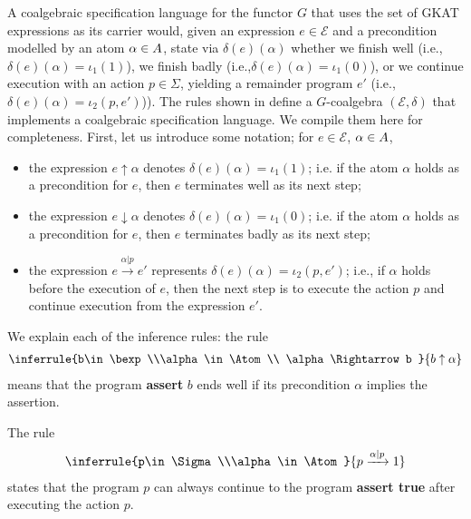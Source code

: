A coalgebraic specification language for the functor $G$ that uses the set of GKAT expressions as its carrier would, given an expression $e\in \mathscr{E}$ and a precondition modelled by an atom $\alpha\in A$, state via $\delta(e)(\alpha)$ whether we finish well (i.e.,$\delta(e)(\alpha)=\iota_1(1)$), we finish badly (i.e.,$\delta(e)(\alpha)=\iota_1(0)$), or we continue execution with an action $p\in \Sigma$, yielding a remainder program $e'$ (i.e.,$\delta(e)(\alpha)=\iota_2(p,e')$)). The rules shown in \cite[Figure 2]{GKATCoequations} define a $G$-coalgebra $(\mathscr{E},\delta)$ that implements a coalgebraic specification language. We compile them here for completeness. First, let us introduce some notation; for $e\in \mathscr{E}$, $\alpha\in A$, 
\begin{itemize}
    \item the expression $e\uparrow \alpha $ denotes $\delta(e)(\alpha)=\iota_1(1)$; i.e. if the atom $\alpha$ holds as a precondition for $e$, then $e$ terminates well as its next step;
    \item the expression $e\downarrow \alpha$ denotes $\delta(e)(\alpha)=\iota_1(0)$; i.e. if the atom $\alpha$ holds as a precondition for $e$, then $e$ terminates badly as its next step;
    \item the expression $e\xrightarrow{\alpha|p}e'$ represents $\delta(e)(\alpha)=\iota_2(p,e')$; i.e., if $\alpha$ holds before the execution of $e$, then the next step is to execute the action $p$ and continue execution from the expression $e'$.
\end{itemize}
We explain each of the inference rules: the rule
\begin{align*}
    \inferrule
    {b\in \bexp\\\alpha\in \Atom \\ \alpha \Rightarrow b }
    {b\uparrow \alpha}    
\end{align*}
means that the program \textbf{assert} $b$ ends well if its precondition $\alpha$ implies the assertion. 

The rule
\begin{align*}
    \inferrule
    {p\in \Sigma\\\alpha\in \Atom}
    {p\xrightarrow{\alpha|p} 1}    
\end{align*}
states that the program $p$ can always continue to the program \textbf{assert true} after executing the action $p$. 

